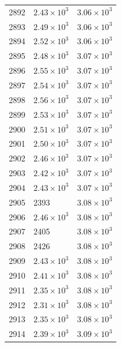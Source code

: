 \begin{table}[H]
\begin{tabular}{lll}
2892 & $\displaystyle 2.43 \times 10^{3}$ & $\displaystyle 3.06 \times 10^{3}$ \\
2893 & $\displaystyle 2.49 \times 10^{3}$ & $\displaystyle 3.06 \times 10^{3}$ \\
2894 & $\displaystyle 2.52 \times 10^{3}$ & $\displaystyle 3.06 \times 10^{3}$ \\
2895 & $\displaystyle 2.48 \times 10^{3}$ & $\displaystyle 3.07 \times 10^{3}$ \\
2896 & $\displaystyle 2.55 \times 10^{3}$ & $\displaystyle 3.07 \times 10^{3}$ \\
2897 & $\displaystyle 2.54 \times 10^{3}$ & $\displaystyle 3.07 \times 10^{3}$ \\
2898 & $\displaystyle 2.56 \times 10^{3}$ & $\displaystyle 3.07 \times 10^{3}$ \\
2899 & $\displaystyle 2.53 \times 10^{3}$ & $\displaystyle 3.07 \times 10^{3}$ \\
2900 & $\displaystyle 2.51 \times 10^{3}$ & $\displaystyle 3.07 \times 10^{3}$ \\
2901 & $\displaystyle 2.50 \times 10^{3}$ & $\displaystyle 3.07 \times 10^{3}$ \\
2902 & $\displaystyle 2.46 \times 10^{3}$ & $\displaystyle 3.07 \times 10^{3}$ \\
2903 & $\displaystyle 2.42 \times 10^{3}$ & $\displaystyle 3.07 \times 10^{3}$ \\
2904 & $\displaystyle 2.43 \times 10^{3}$ & $\displaystyle 3.07 \times 10^{3}$ \\
2905 & 2393 & $\displaystyle 3.08 \times 10^{3}$ \\
2906 & $\displaystyle 2.46 \times 10^{3}$ & $\displaystyle 3.08 \times 10^{3}$ \\
2907 & 2405 & $\displaystyle 3.08 \times 10^{3}$ \\
2908 & 2426 & $\displaystyle 3.08 \times 10^{3}$ \\
2909 & $\displaystyle 2.43 \times 10^{3}$ & $\displaystyle 3.08 \times 10^{3}$ \\
2910 & $\displaystyle 2.41 \times 10^{3}$ & $\displaystyle 3.08 \times 10^{3}$ \\
2911 & $\displaystyle 2.35 \times 10^{3}$ & $\displaystyle 3.08 \times 10^{3}$ \\
2912 & $\displaystyle 2.31 \times 10^{3}$ & $\displaystyle 3.08 \times 10^{3}$ \\
2913 & $\displaystyle 2.35 \times 10^{3}$ & $\displaystyle 3.08 \times 10^{3}$ \\
2914 & $\displaystyle 2.39 \times 10^{3}$ & $\displaystyle 3.09 \times 10^{3}$ \\

\end{tabular}
\end{table}
